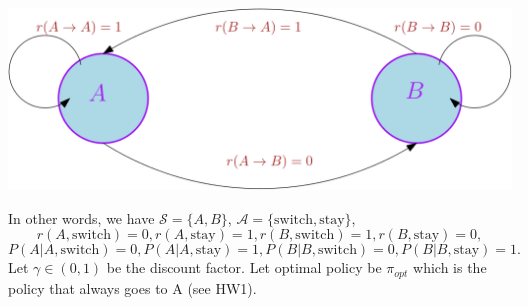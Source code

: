   \vspace{8pt}
  \begin{center}
    \includegraphics[width=0.6\linewidth]{figs/mdp_2state.png}
  \end{center}
  \vspace{8pt}
In other words, we have $\mathcal{S}=\{A,B\}$, $\mathcal{A}=\{\text{switch}, \text{stay}\}$,
$$
r(A,\text{switch})=0, r(A,\text{stay})=1, r(B,\text{switch})=1, r(B,\text{stay})=0,
$$
$$
P(A|A,\text{switch})=0, P(A|A,\text{stay})=1, P(B|B,\text{switch})=0, P(B|B,\text{stay})=1.
$$
Let $\gamma\in(0,1)$ be the discount factor. Let optimal policy be $\pi_{opt}$ which is the policy that always goes to A (see HW1).
